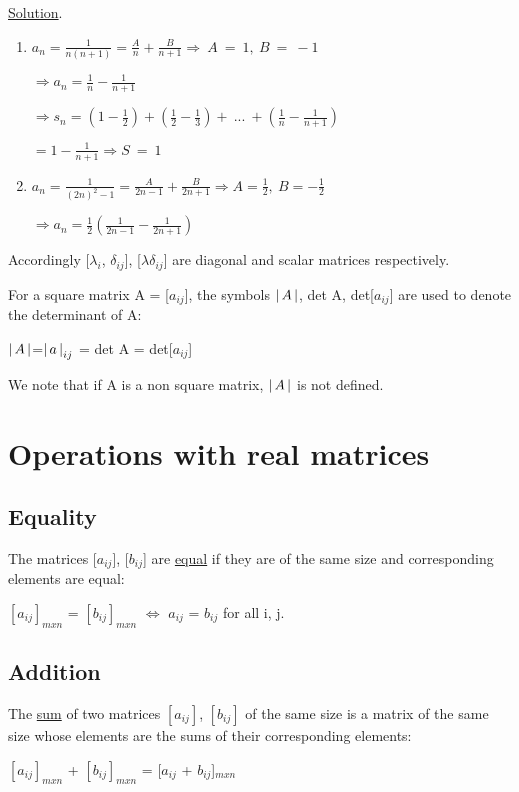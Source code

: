 \documentclass[11pt]{amsbook}
\begin{document}
\underline{Solution}.

\begin{enumerate}[label=(\alph*)]
	
	\item $a_{n}=\frac{1}{n(n+1)}=\frac{A}{n}+\frac{B}{n+1}\Longrightarrow\ A\ =\ 1,\ B\ =\ -1$\par
	$\Longrightarrow a_{n}=\frac{1}{n}-\frac{1}{n+1}$\par
	$\Longrightarrow s_{n}=(1-\frac{1}{2})+(\frac{1}{2}-\frac{1}{3})+\ ...\ +(\frac{1}{n}-\frac{1}{n+1})$\par
	$=1-\frac{1}{n+1}\Longrightarrow S\ =\ 1$
	
	\item $a_{n}=\frac{1}{(2n)^{2}-1}=\frac{A}{2n-1}+\frac{B}{2n+1}\Longrightarrow A=\frac{1}{2},\ B = -\frac{1}{2}$\par
	$\Longrightarrow a_{n}=\frac{1}{2}(\frac{1}{2n-1}-\frac{1}{2n+1})$

\end{enumerate}



Accordingly  [$\lambda_{i}$, $\delta_{ij}$], [$\lambda\delta_{ij}$] are diagonal and scalar matrices respectively.

For a square matrix A = [$a_{ij}$], the symbols $\left \lvert \, A \, \right \rvert$, det A, det[$a_{ij}$] are used to denote the determinant of A:
\begin{center}
$\left \lvert \, A \, \right \rvert$=$\left \lvert \, a \, \right \rvert_{ij}$ = det A = det[$a_{ij}$]
\end{center}
We note that if A is a non  square matrix, $\left \lvert \, A \, \right \rvert$ is not defined.

\section{Operations with real matrices}

\subsection{Equality} The matrices [$a_{ij}$], [$b_{ij}$] are \underline{equal} if they are of the same size and corresponding elements are equal:
\begin{center}
 $[a_{ij}]_{mxn}$ = $[b_{ij}]_{mxn}$ $\iff$ $a_{ij}$ = $b_{ij}$ for all i, j.
\end{center}

\subsection{Addition} The \underline{sum} of two matrices $[a_{ij}]$, $[b_{ij}]$ of the same size is a matrix of the same size whose elements are the sums of their corresponding elements:
\begin{center}
 $[a_{ij}]_{mxn}$ + $[b_{ij}]_{mxn}$ = [$a_{ij}$ + $b_{ij}$]$_{mxn}$
\end{center}
\end{document}
